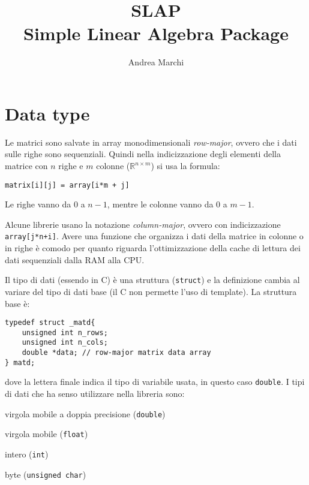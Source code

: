 \documentclass[10pt]{article}
\begin{document}
\title{\textbf{SLAP}\\ Simple Linear Algebra Package}
\author{Andrea Marchi}

\maketitle

\tableofcontents



\section{Data type}

Le matrici sono salvate in array monodimensionali \textit{row-major}, ovvero che i dati sulle righe sono sequenziali. Quindi nella indicizzazione degli elementi della matrice con $n$ righe e $m$ colonne ($\mathbb{R}^{n\times m}$) si usa la formula:
\begin{lstlisting}
matrix[i][j] = array[i*m + j]
\end{lstlisting}
Le righe vanno da $0$ a $n-1$, mentre le colonne vanno da $0$ a $m-1$.

Alcune librerie usano la notazione \textit{column-major}, ovvero con indicizzazione \verb|array[j*n+i]|. Avere una funzione che organizza i dati della matrice in colonne o in righe è comodo per quanto riguarda l'ottimizzazione della cache di lettura dei dati sequenziali dalla RAM alla CPU.

Il tipo di dati (essendo in C) è una struttura (\verb|struct|) e la definizione cambia al variare del tipo di dati base (il C non permette l'uso di template).
La struttura base è:
\begin{lstlisting}
typedef struct _matd{
	unsigned int n_rows;
	unsigned int n_cols;
	double *data; // row-major matrix data array
} matd;
\end{lstlisting}
dove la lettera finale indica il tipo di variabile usata, in questo caso \verb|double|. I tipi di dati che ha senso utilizzare nella libreria sono:
\begin{description}[noitemsep]
\item[\texttt{d}] virgola mobile a doppia precisione (\verb|double|)
\item[\texttt{f}] virgola mobile (\verb|float|)
\item[\texttt{i}] intero (\verb|int|)
\item[\texttt{b}] byte (\verb|unsigned char|)
\end{description}
\end{document}
